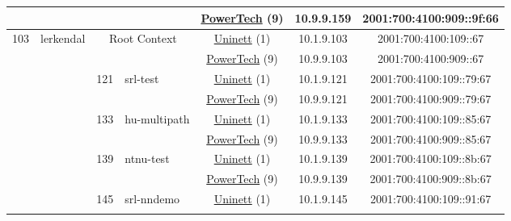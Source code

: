 \begin{small}
\begin{center}
\begin{longtable}{|c|c|c|c|c|c|c|c|}
  &  &  &  & \multicolumn{2}{|c|}{\tiny{\href{http://www.powertech.no}{PowerTech} (9)}} & \tiny{10.9.9.159} & \tiny{2001:700:4100:909::9f:66} \\ \hline
 \multirow{12}{*}{\tiny{103}} & \multicolumn{1}{|l|}{\multirow{12}{*}{\tiny{lerkendal}}} & \multicolumn{2}{|c|}{\multirow{2}{*}{\tiny{Root Context}}} & \multicolumn{2}{|c|}{\tiny{\href{https://www.uninett.no}{Uninett} (1)}} & \tiny{10.1.9.103} & \tiny{2001:700:4100:109::67} \\* \cline{5-5}\cline{6-6}\cline{7-7}\cline{8-8}
  &  & \multicolumn{2}{|c|}{} & \multicolumn{2}{|c|}{\tiny{\href{http://www.powertech.no}{PowerTech} (9)}} & \tiny{10.9.9.103} & \tiny{2001:700:4100:909::67} \\* \cline{3-3}\cline{4-4}\cline{5-5}\cline{6-6}\cline{7-7}\cline{8-8}
  &  & \multirow{2}{*}{\tiny{121}} & \multicolumn{1}{|l|}{\multirow{2}{*}{\tiny{srl-test}}} & \multicolumn{2}{|c|}{\tiny{\href{https://www.uninett.no}{Uninett} (1)}} & \tiny{10.1.9.121} & \tiny{2001:700:4100:109::79:67} \\* \cline{5-5}\cline{6-6}\cline{7-7}\cline{8-8}
  &  &  &  & \multicolumn{2}{|c|}{\tiny{\href{http://www.powertech.no}{PowerTech} (9)}} & \tiny{10.9.9.121} & \tiny{2001:700:4100:909::79:67} \\* \cline{3-3}\cline{4-4}\cline{5-5}\cline{6-6}\cline{7-7}\cline{8-8}
  &  & \multirow{2}{*}{\tiny{133}} & \multicolumn{1}{|l|}{\multirow{2}{*}{\tiny{hu-multipath}}} & \multicolumn{2}{|c|}{\tiny{\href{https://www.uninett.no}{Uninett} (1)}} & \tiny{10.1.9.133} & \tiny{2001:700:4100:109::85:67} \\* \cline{5-5}\cline{6-6}\cline{7-7}\cline{8-8}
  &  &  &  & \multicolumn{2}{|c|}{\tiny{\href{http://www.powertech.no}{PowerTech} (9)}} & \tiny{10.9.9.133} & \tiny{2001:700:4100:909::85:67} \\* \cline{3-3}\cline{4-4}\cline{5-5}\cline{6-6}\cline{7-7}\cline{8-8}
  &  & \multirow{2}{*}{\tiny{139}} & \multicolumn{1}{|l|}{\multirow{2}{*}{\tiny{ntnu-test}}} & \multicolumn{2}{|c|}{\tiny{\href{https://www.uninett.no}{Uninett} (1)}} & \tiny{10.1.9.139} & \tiny{2001:700:4100:109::8b:67} \\* \cline{5-5}\cline{6-6}\cline{7-7}\cline{8-8}
  &  &  &  & \multicolumn{2}{|c|}{\tiny{\href{http://www.powertech.no}{PowerTech} (9)}} & \tiny{10.9.9.139} & \tiny{2001:700:4100:909::8b:67} \\* \cline{3-3}\cline{4-4}\cline{5-5}\cline{6-6}\cline{7-7}\cline{8-8}
  &  & \multirow{2}{*}{\tiny{145}} & \multicolumn{1}{|l|}{\multirow{2}{*}{\tiny{srl-nndemo}}} & \multicolumn{2}{|c|}{\tiny{\href{https://www.uninett.no}{Uninett} (1)}} & \tiny{10.1.9.145} & \tiny{2001:700:4100:109::91:67} \\* \cline{5-5}\cline{6-6}\cline{7-7}\cline{8-8}

\end{longtable}
\end{center}
\end{small}
